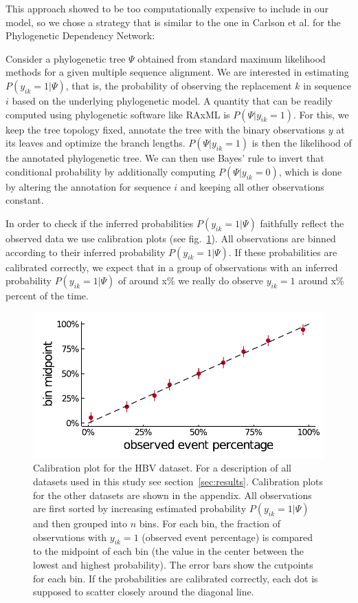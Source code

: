\documentclass[fleqn,11pt]{SelfArx} %
\begin{document}
This approach showed to be too computationally expensive to include in our model, so we chose a strategy that is similar to the one in Carlson et al. \cite{Carlson2008} for the Phylogenetic Dependency Network:

Consider a phylogenetic tree \(\Psi\) obtained from standard maximum likelihood methods for a given multiple sequence alignment. We are interested in estimating \(P(y_{ik}=1|\Psi)\), that is, the probability of observing the replacement \(k\) in sequence \(i\) based on the underlying phylogenetic model.
A quantity that can be readily computed using phylogenetic software like RAxML \cite{Stamatakis2014} is \(P(\Psi|y_{ik}=1)\). For this, we keep the tree topology fixed, annotate the tree with the binary observations \(y\) at its leaves and optimize the branch lengths. \(P(\Psi|y_{ik}=1)\) is then the likelihood of the annotated phylogenetic tree. We can then use Bayes' rule to invert that conditional probability by additionally computing \(P(\Psi|y_{ik}=0)\), which is done by altering the annotation for sequence \(i\) and keeping all other observations constant.

In order to check if the inferred probabilities \(P(y_{ik}=1|\Psi)\) faithfully reflect the observed data we use calibration plots (see fig.~\ref{fig:phylogeny-calibration}). All observations are binned according to their inferred probability \(P(y_{ik}=1|\Psi)\). If these probabilities are calibrated correctly, we expect that in a group of observations with an inferred probability \(P(y_{ik}=1|\Psi)\) of around x\% we really do observe \(y_{ik}=1\) around x\% percent of the time.

\begin{figure}[!ht]
  \includegraphics[width=1\linewidth]{plots/phylogeny_calibration.pdf}
  \caption{Calibration plot for the HBV dataset. For a description of all datasets used in this study see section~\ref{sec:results}. Calibration plots for the other datasets are shown in the appendix.
  All observations are first sorted by increasing estimated probability \(P(y_{ik}=1|\Psi)\) and then grouped into \(n\) bins.
  For each bin, the fraction of observations with \(y_{ik}=1\) (observed event percentage) is compared to the midpoint of each bin (the value in the center between the lowest and highest probability). The error bars show the cutpoints for each bin. If the probabilities are calibrated correctly, each dot is supposed to scatter closely around the diagonal line.}
  \label{fig:phylogeny-calibration}
\end{figure}
\end{document}
